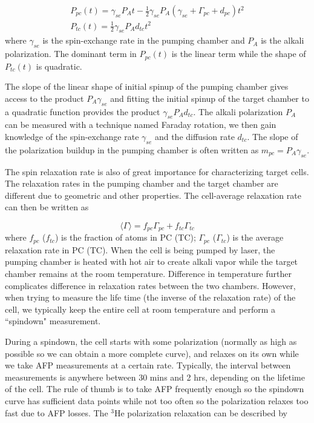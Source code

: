 \begin{subequations}\label{InitialSpinup}
	\begin{gather}
	P_{pc}(t)=\gamma_{se}P_{A}t-\frac{1}{2}\gamma_{se}P_{A}(\gamma_{se}+\Gamma_{pc}+d_{pc})t^{2}\\
	P_{tc}(t)=\frac{1}{2}\gamma_{se}P_{A}d_{tc}t^{2}
	\end{gather}
\end{subequations}
where $\gamma_{se}$ is the spin-exchange rate in the pumping chamber and $P_{A}$ is the alkali polarization. The dominant term in $P_{pc}(t)$ is the linear term while the shape of $P_{tc}(t)$ is quadratic. 

The slope of the linear shape of initial spinup of the pumping chamber gives access to the product $P_{A}\gamma_{se}$ and fitting the initial spinup of the target chamber to a quadratic function provides the product $\gamma_{se}P_{A}d_{tc}$. The alkali polarization $P_{A}$ can be measured with a technique named Faraday rotation, we then gain knowledge of the spin-exchange rate $\gamma_{se}$ and the diffusion rate $d_{tc}$. The slope of the polarization buildup in the pumping chamber is often written as $m_{pc}=P_{A}\gamma_{se}$. 

The spin relaxation rate is also of great importance for characterizing target cells. The relaxation rates in the pumping chamber and the target chamber are different due to geometric and other properties. The cell-average relaxation rate can then be written as

\begin{equation}
\langle \Gamma \rangle=f_{pc}\Gamma_{pc}+f_{tc}\Gamma_{tc}
\end{equation}
where $f_{pc}$ ($f_{tc}$) is the fraction of atoms in PC (TC); $\Gamma_{pc}$ ($\Gamma_{tc}$) is the average relaxation rate in PC (TC). When the cell is being pumped by laser, the pumping chamber is heated with hot air to create alkali vapor while the target chamber remains at the room temperature. Difference in temperature further complicates difference in relaxation rates between the two chambers. However, when trying to measure the life time (the inverse of the relaxation rate) of the cell, we typically keep the entire cell at room temperature and perform a ``spindown" measurement. 

During a spindown, the cell starts with some polarization (normally as high as possible so we can obtain a more complete curve), and relaxes on its own while we take AFP measurements at a certain rate. Typically, the interval between measurements is anywhere between 30 mins and 2 hrs, depending on the lifetime of the cell. The rule of thumb is to take AFP frequently enough so the spindown curve has sufficient data points while not too often so the polarization relaxes too fast due to AFP losses. The $^{3}$He polarization relaxation can be described by

